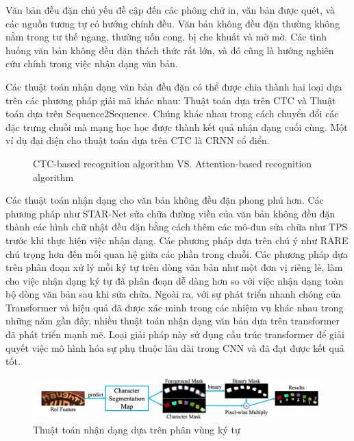 Văn bản đều đặn chủ yếu đề cập đến các phông chữ in, văn bản được quét, và các nguồn tương tự có hướng chính đều. Văn bản không đều đặn thường không nằm trong tư thế ngang, thường uốn cong, bị che khuất và mờ mờ. Các tình huống văn bản không đều đặn thách thức rất lớn, và đó cũng là hướng nghiên cứu chính trong việc nhận dạng văn bản.

Các thuật toán nhận dạng văn bản đều đặn có thể được chia thành hai loại dựa trên các phương pháp giải mã khác nhau: Thuật toán dựa trên CTC và Thuật toán dựa trên Sequence2Sequence. Chúng khác nhau trong cách chuyển đổi các đặc trưng chuỗi mà mạng học học được thành kết quả nhận dạng cuối cùng. Một ví dụ đại diện cho thuật toán dựa trên CTC là CRNN cổ điển.

\begin{figure}[p]
    
    \centering
    \caption{CTC-based recognition algorithm VS. Attention-based recognition algorithm}
\end{figure}

Các thuật toán nhận dạng cho văn bản không đều đặn phong phú hơn. Các phương pháp như STAR-Net sửa chữa đường viền của văn bản không đều đặn thành các hình chữ nhật đều đặn bằng cách thêm các mô-đun sửa chữa như TPS trước khi thực hiện việc nhận dạng. Các phương pháp dựa trên chú ý như RARE chú trọng hơn đến mối quan hệ giữa các phần trong chuỗi. Các phương pháp dựa trên phân đoạn xử lý mỗi ký tự trên dòng văn bản như một đơn vị riêng lẻ, làm cho việc nhận dạng ký tự đã phân đoạn dễ dàng hơn so với việc nhận dạng toàn bộ dòng văn bản sau khi sửa chữa. Ngoài ra, với sự phát triển nhanh chóng của Transformer và hiệu quả đã được xác minh trong các nhiệm vụ khác nhau trong những năm gần đây, nhiều thuật toán nhận dạng văn bản dựa trên transformer đã phát triển mạnh mẽ. Loại giải pháp này sử dụng cấu trúc transformer để giải quyết việc mô hình hóa sự phụ thuộc lâu dài trong CNN và đã đạt được kết quả tốt.

\begin{figure}
    \includegraphics[scale=0.35]{images/recognition-based-charcter-segmentation.png}
    \centering
    \caption{Thuật toán nhận dạng dựa trên phân vùng ký tự}
\end{figure}


